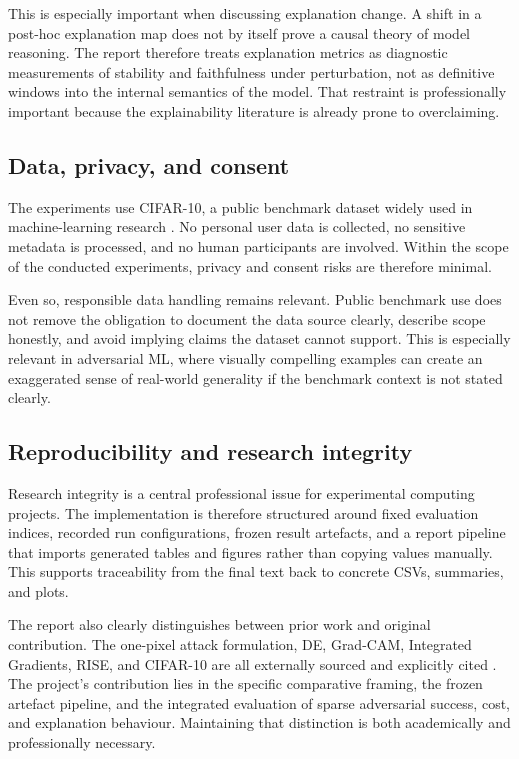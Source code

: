 This is especially important when discussing explanation change.
A shift in a post-hoc explanation map does not by itself prove a causal theory of model reasoning.
The report therefore treats explanation metrics as diagnostic measurements of stability and faithfulness under perturbation, not as definitive windows into the internal semantics of the model.
That restraint is professionally important because the explainability literature is already prone to overclaiming.

\subsection{Data, privacy, and consent}
The experiments use CIFAR-10, a public benchmark dataset widely used in machine-learning research \cite{krizhevsky2009cifar}.
No personal user data is collected, no sensitive metadata is processed, and no human participants are involved.
Within the scope of the conducted experiments, privacy and consent risks are therefore minimal.

Even so, responsible data handling remains relevant.
Public benchmark use does not remove the obligation to document the data source clearly, describe scope honestly, and avoid implying claims the dataset cannot support.
This is especially relevant in adversarial ML, where visually compelling examples can create an exaggerated sense of real-world generality if the benchmark context is not stated clearly.

\subsection{Reproducibility and research integrity}
Research integrity is a central professional issue for experimental computing projects.
The implementation is therefore structured around fixed evaluation indices, recorded run configurations, frozen result artefacts, and a report pipeline that imports generated tables and figures rather than copying values manually.
This supports traceability from the final text back to concrete CSVs, summaries, and plots.

The report also clearly distinguishes between prior work and original contribution.
The one-pixel attack formulation, DE, Grad-CAM, Integrated Gradients, RISE, and CIFAR-10 are all externally sourced and explicitly cited \cite{su2019onepixel,storn1997de,selvaraju2017gradcam,sundararajan2017ig,petsiuk2018rise,krizhevsky2009cifar}.
The project's contribution lies in the specific comparative framing, the frozen artefact pipeline, and the integrated evaluation of sparse adversarial success, cost, and explanation behaviour.
Maintaining that distinction is both academically and professionally necessary.

